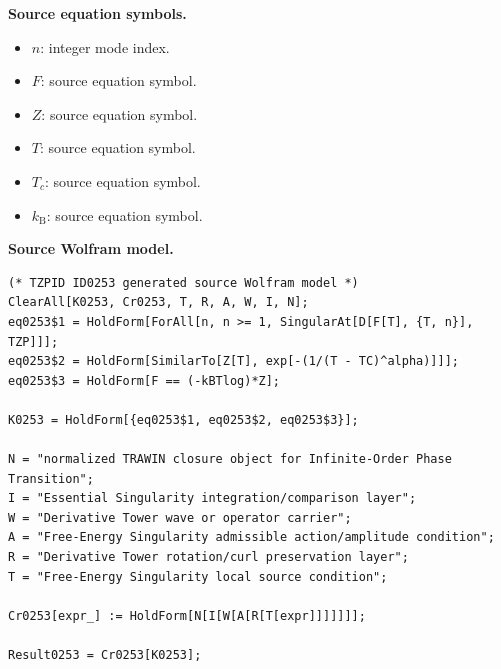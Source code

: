 \begin{minipage}[t]{0.49\linewidth}
\begingroup
\small
\raggedright
\textbf{Source equation symbols.}\par
\begin{itemize}[leftmargin=1.35em,itemsep=1pt,topsep=1pt,parsep=0pt]
    \item $n$: integer mode index.
    \item $F$: source equation symbol.
    \item $Z$: source equation symbol.
    \item $T$: source equation symbol.
    \item $T_c$: source equation symbol.
    \item $k_{\mathrm{B}}$: source equation symbol.
\end{itemize}
\endgroup
\end{minipage}\hfill
\begin{minipage}[t]{0.47\linewidth}
\begingroup
\scriptsize
\raggedright
\textbf{Source Wolfram model.}\par
\begin{Verbatim}[fontsize=\tiny,breaklines=true,breakanywhere=true]
(* TZPID ID0253 generated source Wolfram model *)
ClearAll[K0253, Cr0253, T, R, A, W, I, N];
eq0253$1 = HoldForm[ForAll[n, n >= 1, SingularAt[D[F[T], {T, n}], TZP]]];
eq0253$2 = HoldForm[SimilarTo[Z[T], exp[-(1/(T - TC)^alpha)]]];
eq0253$3 = HoldForm[F == (-kBTlog)*Z];

K0253 = HoldForm[{eq0253$1, eq0253$2, eq0253$3}];

N = "normalized TRAWIN closure object for Infinite-Order Phase Transition";
I = "Essential Singularity integration/comparison layer";
W = "Derivative Tower wave or operator carrier";
A = "Free-Energy Singularity admissible action/amplitude condition";
R = "Derivative Tower rotation/curl preservation layer";
T = "Free-Energy Singularity local source condition";

Cr0253[expr_] := HoldForm[N[I[W[A[R[T[expr]]]]]]];

Result0253 = Cr0253[K0253];
\end{Verbatim}
\endgroup
\end{minipage}

